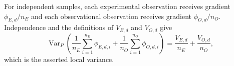 For independent samples, each experimental observation receives gradient \(\phi_{E,d}/n_E\) and each observational observation receives gradient \(\phi_{O,d}/n_O\).  Independence and the definitions of \(V_{E,d}\) and \(V_{O,d}\) give
\[
 \operatorname{Var}_P\!\left(
  \frac1{n_E}\sum_{i=1}^{n_E}\phi_{E,d,i}
 +\frac1{n_O}\sum_{i=1}^{n_O}\phi_{O,d,i}\right)
 =\frac{V_{E,d}}{n_E}+\frac{V_{O,d}}{n_O},
\]
which is the asserted local variance.